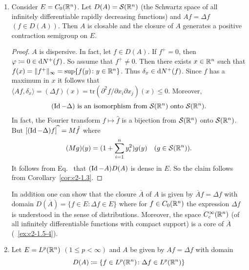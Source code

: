 \begin{examples}
\begin{enumerate}[\upshape (i), wide, labelindent=.25em]
\begin{proof}
We have shown that $A$ is dispersive. 
As in~\ref{ex:c2-1.5-1} one shows that $(\Id - A)$ is surjective. 
Now the claim follows from Theorem~\ref{thm:c2-1.2}.
\end{proof}
\item \label{ex:c2-1.5-3} 
Consider $E = C_{0}(\mathbb{R}^{n})$. 
Let $D(A) = \mathcal{S}(\mathbb{R}^{n})$ (the Schwartz space of all infinitely differentiable rapidly decreasing functions) and $Af = \Delta f$ $(f \in D(A))$. 
Then $A$ is closable and the closure of\/ $A$ generates a positive contraction semigroup on $E$.
\begin{proof}
$A$ is dispersive. 
In fact, let $f \in D(A)$. 
If\/ $f^{+} = 0$, then $\phi \coloneq 0 \in \diff{N^{+}}(f)$. 
So assume that $f^{+} \neq 0$. 
Then there exists $x \in \mathbb{R}^{n}$ such that $f(x) = \|f^{+}\|_{\infty} = \sup\{f(y) \colon y \in \mathbb{R}^{n}\}$. 
Thus $\delta_{x} \in \mathop{}\!\mathrm{d}{N^{+}}(f)$.
Since $f$ has a maximum in $x$ it follows that $\langle Af,\delta_{x} \rangle = (\Delta f)(x) = \text{tr}(\partial^{2}f/\partial x_{i}\partial x_{j})(x) \leq 0$. 
Moreover,
\begin{equation}\label{eq:c2-1.3}
(\operatorname{Id} - \Delta) \text{ is an isomorphism from } \mathcal{S}(\mathbb{R}^{n}) \text{ onto } \mathcal{S}(\mathbb{R}^{n}).
\end{equation}
In fact, the Fourier transform $f \mapsto \hat{f}$ is a bijection from $\mathcal{S}(\mathbb{R}^{n})$ onto $\mathcal{S}(\mathbb{R}^{n})$.
But $[(\operatorname{Id} - \Delta)f]^{\widehat{\ }} = M\hat{f}$ where 
\[
(Mg)(y) = (1 + \sum_{i=1}^{n} y_{i}^{2})g(y) \quad (g \in \mathcal{S}(\mathbb{R}^{n})) .
\]
It follows from Eq.~ that $(\operatorname{Id} - A)D(A)$ is dense in $E$. So the claim follows from Corollary~\ref{cor:c2-1.3}.
\end{proof}
\begin{remark*}\label{rem:c2-1.2}
%
In addition one can show that the closure $\overline{A}$ of\/ $A$ is given by $\overline{A}f = \Delta f$ with domain $D(\overline{A}) = \{f \in E \colon \Delta f \in E\}$ where for
$f \in C_{0}(\mathbb{R}^{n})$ the expression $\Delta f$ is understood in the sense of distributions. 
Moreover, the space $C_{c}^{\infty}(\mathbb{R}^{n})$ (of all infinitely differentiable functions with compact support) is a core of\/ $\overline{A}$ (\cf~\ref{ex:c2-1.5-4}).
\end{remark*}
\item \label{ex:c2-1.5-4} 
Let $E = L^{p}(\mathbb{R}^{n})$ $(1 \leq p < \infty)$ and $A$ be given by $Af = \Delta f$ with domain 
\[
D(A) \coloneq \{f \in L^{p}(\mathbb{R}^{n}) \colon \Delta f \in L^{p}(\mathbb{R}^{n})\}
\]
\end{enumerate}
\end{examples}
